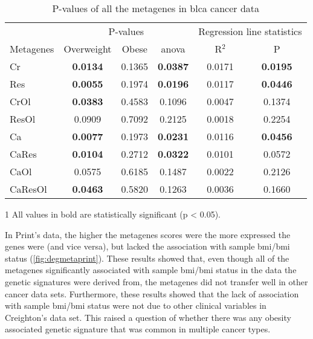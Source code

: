 \begin{table}[htpb]
	\centering
	\caption{P-values of all the metagenes in \gls{blca} cancer data}
	\label{tab:degmetablca}
	\begin{threeparttable}
		\begin{tabular}{lccccc}
			& \multicolumn{3}{c}{ P-values} & \multicolumn{2}{c}{ Regression line statistics}\\
			\cmidrule(r){2-4} \cmidrule(r){5-6}
			 Metagenes &  Overweight &  Obese &  \gls{anova} &  R$^2$ &  P \\
			\hline
			\hline
			\rule{0pt}{2.25ex}Cr & {\bfseries 0.0134}\tnote{1} & 0.1365 & {\bfseries 0.0387} & 0.0171 & {\bfseries 0.0195} \\
			Res                  & {\bfseries 0.0055}          & 0.1974 & {\bfseries 0.0196} & 0.0117 & {\bfseries 0.0446} \\
			CrOl                 & {\bfseries 0.0383}          & 0.4583 & 0.1096             & 0.0047 & 0.1374             \\
			ResOl                & 0.0909                      & 0.7092 & 0.2125             & 0.0018 & 0.2254             \\
			Ca                   & {\bfseries 0.0077}          & 0.1973 & {\bfseries 0.0231} & 0.0116 & {\bfseries 0.0456} \\
			CaRes                & {\bfseries 0.0104}          & 0.2712 & {\bfseries 0.0322} & 0.0101 & 0.0572             \\
			CaOl                 & 0.0575                      & 0.6185 & 0.1487             & 0.0022 & 0.2126             \\
			CaResOl              & {\bfseries 0.0463}          & 0.5820 & 0.1263             & 0.0036 & 0.1660             \\
			\hline
			\hline
		\end{tabular}
		\begin{tablenotes}
			\item [1] All values in bold are statistically significant (p \textless{} 0.05).
		\end{tablenotes}
	\end{threeparttable}
\end{table}

In Print's data, the higher the metagenes scores were the more expressed the genes were (and vice versa), but lacked the association with sample \gls{bmi}/\gls{bmi} status (\cref{fig:degmetaprint}).
These results showed that, even though all of the metagenes significantly associated with sample \gls{bmi}/\gls{bmi} status in the data the genetic signatures were derived from, the metagenes did not transfer well in other cancer data sets.
Furthermore, these results showed that the lack of association with sample \gls{bmi}/\gls{bmi} status were not due to other clinical variables in Creighton's data set.
This raised a question of whether there was any obesity associated genetic signature that was common in multiple cancer types.

